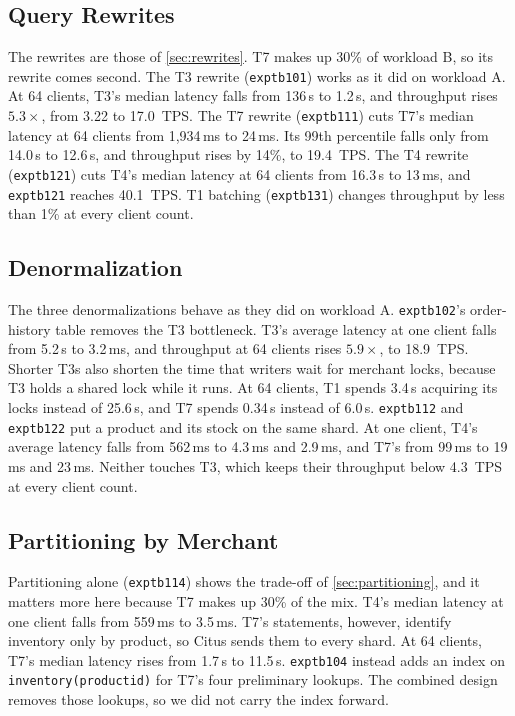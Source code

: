 \documentclass[sigconf,10pt,nonacm]{acmart}
\newcommand{\expt}[1]{\texttt{expt\textunderscore #1}}
\renewcommand{\_}{\underscorewithoutbreak\allowbreak}
\begin{document}
\subsection{Query Rewrites}
\label{sec:b-rewrites}

The rewrites are those of \cref{sec:rewrites}. T7 makes up 30\% of workload B, so its
rewrite comes second. The T3 rewrite (\expt{b101}) works as it did on workload A. At
64 clients, T3's median latency falls from 136\,s to 1.2\,s, and throughput rises
$5.3\times$, from 3.22 to 17.0~TPS. The T7 rewrite (\expt{b111}) cuts T7's median
latency at 64 clients from 1,934\,ms to 24\,ms. Its 99th percentile falls only from
14.0\,s to 12.6\,s, and throughput rises by 14\%, to 19.4~TPS. The T4 rewrite
(\expt{b121}) cuts T4's median latency at 64 clients from 16.3\,s to 13\,ms, and
\expt{b121} reaches 40.1~TPS. T1 batching (\expt{b131}) changes throughput by less than
1\% at every client count.

\subsection{Denormalization}
\label{sec:b-denormalization}

The three denormalizations behave as they did on workload A. \expt{b102}'s
order-history table removes the T3 bottleneck. T3's average latency at one client falls
from 5.2\,s to 3.2\,ms, and throughput at 64 clients rises $5.9\times$, to 18.9~TPS.
Shorter T3s also shorten the time that writers wait for merchant locks, because T3
holds a shared lock while it runs. At 64 clients, T1 spends 3.4\,s acquiring its locks
instead of 25.6\,s, and T7 spends 0.34\,s instead of 6.0\,s. \expt{b112} and
\expt{b122} put a product and its stock on the same shard. At one client, T4's average
latency falls from 562\,ms to 4.3\,ms and 2.9\,ms, and T7's from 99\,ms to 19\,ms and
23\,ms. Neither touches T3, which keeps their throughput below 4.3~TPS at every client
count.

\subsection{Partitioning by Merchant}
\label{sec:b-partitioning}

Partitioning alone (\expt{b114}) shows the trade-off of \cref{sec:partitioning}, and it
matters more here because T7 makes up 30\% of the mix. T4's median latency at one
client falls from 559\,ms to 3.5\,ms. T7's statements, however, identify inventory only
by product, so Citus sends them to every shard. At 64 clients, T7's median latency
rises from 1.7\,s to 11.5\,s. \expt{b104} instead adds an index on
\texttt{inventory(product\_id)} for T7's four preliminary lookups. The combined design
removes those lookups, so we did not carry the index forward.
\end{document}
